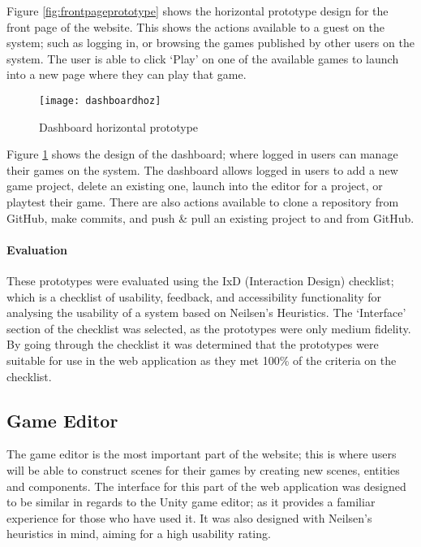 	Figure \ref{fig:frontpageprototype} shows the horizontal prototype design for the front page of the website. This shows the actions available to a guest on the system; such as logging in, or browsing the games published by other users on the system. The user is able to click `Play' on one of the available games to launch into a new page where they can play that game.

	\begin{figure}[h]
		\centering
		\texttt{[image: dashboardhoz]}
		\caption{Dashboard horizontal prototype}
		\label{fig:dashboardprototype}
	\end{figure}

	Figure \ref{fig:dashboardprototype} shows the design of the dashboard; where logged in users can manage their games on the system. The dashboard allows logged in users to add a new game project, delete an existing one, launch into the editor for a project, or playtest their game. There are also actions available to clone a repository from GitHub, make commits, and push \& pull an existing project to and from GitHub.

	\paragraph{Evaluation}
	These prototypes were evaluated using the IxD (Interaction Design) checklist; which is a checklist of usability, feedback, and accessibility functionality for analysing the usability of a system based on Neilsen's Heuristics. The `Interface' section of the checklist was selected, as the prototypes were only medium fidelity. By going through the checklist it was determined that the prototypes were suitable for use in the web application as they met 100\% of the criteria on the checklist.



	\subsection{Game Editor}
	The game editor is the most important part of the website; this is where users will be able to construct scenes for their games by creating new scenes, entities and components. The interface for this part of the web application was designed to be similar in regards to the Unity game editor; as it provides a familiar experience for those who have used it. It was also designed with Neilsen's heuristics in mind, aiming for a high usability rating.

